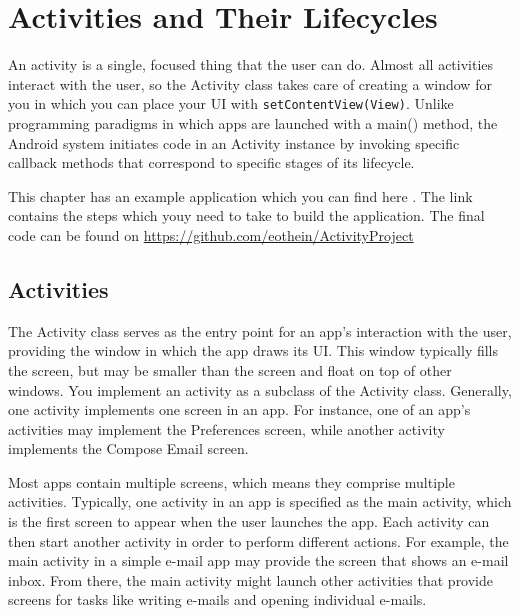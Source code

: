 


\chapter{Activities and Their Lifecycles}




An activity is a single, focused thing that the user can do. Almost all activities interact with the user, so the Activity class takes care of creating a window for you in which you can place your UI with 
\texttt{setContentView(View)}. Unlike programming paradigms in which apps are launched with a main() method, the Android system initiates code in an Activity instance by invoking specific callback methods that correspond to specific stages of its lifecycle.

\begin{framed}
	This chapter has an example application which you can find here \cite{GoogleDevelopers2018}. The link contains the steps which youy need to take to build the application. The final code can be found on \url{https://github.com/eothein/ActivityProject}	
\end{framed}


\section{Activities}
The Activity class serves as the entry point for an app’s interaction with the user, providing the window in which the app draws its UI. This window typically fills the screen, but may be smaller than the screen and float on top of other windows. You implement an activity as a subclass of the Activity class. Generally, one activity implements one screen in an app. For instance, one of an app’s activities may implement the Preferences screen, while another activity implements the Compose Email screen.

Most apps contain multiple screens, which means they comprise multiple activities. Typically, one activity in an app is specified as the main activity, which is the first screen to appear when the user launches the app. Each activity can then start another activity in order to perform different actions. For example, the main activity in a simple e-mail app may provide the screen that shows an e-mail inbox. From there, the main activity might launch other activities that provide screens for tasks like writing e-mails and opening individual e-mails.


